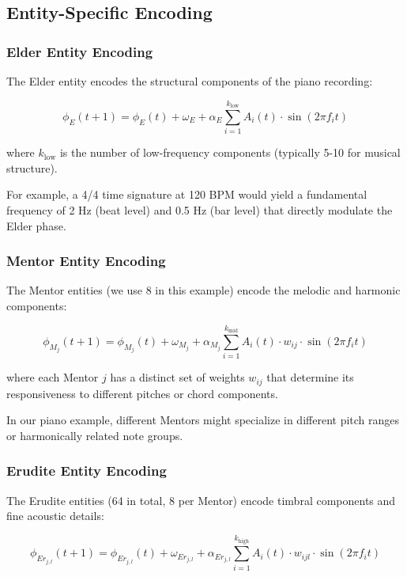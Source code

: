 \subsection{Entity-Specific Encoding}

\subsubsection{Elder Entity Encoding}

The Elder entity encodes the structural components of the piano recording:

\begin{equation}
\phi_E(t+1) = \phi_E(t) + \omega_E + \alpha_E \sum_{i=1}^{k_{\text{low}}} A_i(t) \cdot \sin(2\pi f_i t)
\end{equation}

where $k_{\text{low}}$ is the number of low-frequency components (typically 5-10 for musical structure).

For example, a 4/4 time signature at 120 BPM would yield a fundamental frequency of 2 Hz (beat level) and 0.5 Hz (bar level) that directly modulate the Elder phase.

\subsubsection{Mentor Entity Encoding}

The Mentor entities (we use 8 in this example) encode the melodic and harmonic components:

\begin{equation}
\phi_{M_j}(t+1) = \phi_{M_j}(t) + \omega_{M_j} + \alpha_{M_j} \sum_{i=1}^{k_{\text{mid}}} A_i(t) \cdot w_{ij} \cdot \sin(2\pi f_i t)
\end{equation}

where each Mentor $j$ has a distinct set of weights $w_{ij}$ that determine its responsiveness to different pitches or chord components.

In our piano example, different Mentors might specialize in different pitch ranges or harmonically related note groups.

\subsubsection{Erudite Entity Encoding}

The Erudite entities (64 in total, 8 per Mentor) encode timbral components and fine acoustic details:

\begin{equation}
\phi_{Er_{j,l}}(t+1) = \phi_{Er_{j,l}}(t) + \omega_{Er_{j,l}} + \alpha_{Er_{j,l}} \sum_{i=1}^{k_{\text{high}}} A_i(t) \cdot w_{ijl} \cdot \sin(2\pi f_i t)
\end{equation}

